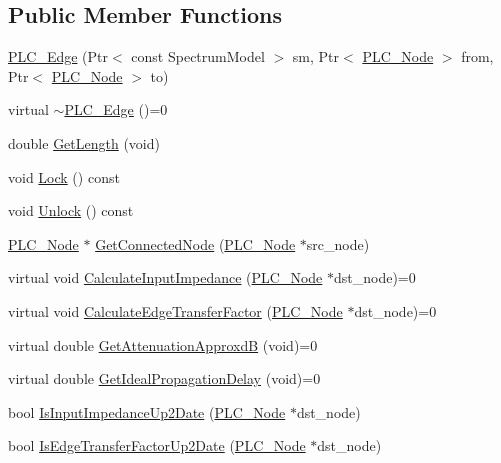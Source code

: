 \subsection*{\-Public \-Member \-Functions}
\begin{DoxyCompactItemize}
\item 
\hyperlink{classns3_1_1PLC__Edge_a22660fa9d5fa0759b15808662b15d8e0}{\-P\-L\-C\-\_\-\-Edge} (\-Ptr$<$ const \-Spectrum\-Model $>$ sm, \-Ptr$<$ \hyperlink{classns3_1_1PLC__Node}{\-P\-L\-C\-\_\-\-Node} $>$ from, \-Ptr$<$ \hyperlink{classns3_1_1PLC__Node}{\-P\-L\-C\-\_\-\-Node} $>$ to)
\item 
virtual \hyperlink{classns3_1_1PLC__Edge_a77e3e30630a1c0ad98e8c3592842606b}{$\sim$\-P\-L\-C\-\_\-\-Edge} ()=0
\item 
double \hyperlink{classns3_1_1PLC__Edge_a630eb9fa431f6bea93c4f991a0ff17fa}{\-Get\-Length} (void)
\item 
void \hyperlink{classns3_1_1PLC__Edge_a01a3d9a0a340ef3c012bc7961fdbb489}{\-Lock} () const 
\item 
void \hyperlink{classns3_1_1PLC__Edge_a43e39fe1abb80ca4af68218cf5de99f7}{\-Unlock} () const 
\item 
\hyperlink{classns3_1_1PLC__Node}{\-P\-L\-C\-\_\-\-Node} $\ast$ \hyperlink{classns3_1_1PLC__Edge_adce513462cb101c6710785641ab2beae}{\-Get\-Connected\-Node} (\hyperlink{classns3_1_1PLC__Node}{\-P\-L\-C\-\_\-\-Node} $\ast$src\-\_\-node)
\item 
virtual void \hyperlink{classns3_1_1PLC__Edge_a0ad990652f55b19e05ff5dbf7a76b568}{\-Calculate\-Input\-Impedance} (\hyperlink{classns3_1_1PLC__Node}{\-P\-L\-C\-\_\-\-Node} $\ast$dst\-\_\-node)=0
\item 
virtual void \hyperlink{classns3_1_1PLC__Edge_ae2f1a73e1388daf1c98dd0647fed52fd}{\-Calculate\-Edge\-Transfer\-Factor} (\hyperlink{classns3_1_1PLC__Node}{\-P\-L\-C\-\_\-\-Node} $\ast$dst\-\_\-node)=0
\item 
virtual double \hyperlink{classns3_1_1PLC__Edge_ab1bd5e82652cf7575118e0658ba0d8ea}{\-Get\-Attenuation\-Approxd\-B} (void)=0
\item 
virtual double \hyperlink{classns3_1_1PLC__Edge_a3c83c3916dba13109ef53ad476390f4d}{\-Get\-Ideal\-Propagation\-Delay} (void)=0
\item 
bool \hyperlink{classns3_1_1PLC__Edge_ace741bd174171405f05cc8f67aa12464}{\-Is\-Input\-Impedance\-Up2\-Date} (\hyperlink{classns3_1_1PLC__Node}{\-P\-L\-C\-\_\-\-Node} $\ast$dst\-\_\-node)
\item 
bool \hyperlink{classns3_1_1PLC__Edge_a32ee8533ac45cf7de4a8dbcf6ea082c3}{\-Is\-Edge\-Transfer\-Factor\-Up2\-Date} (\hyperlink{classns3_1_1PLC__Node}{\-P\-L\-C\-\_\-\-Node} $\ast$dst\-\_\-node)

\end{DoxyCompactItemize}
